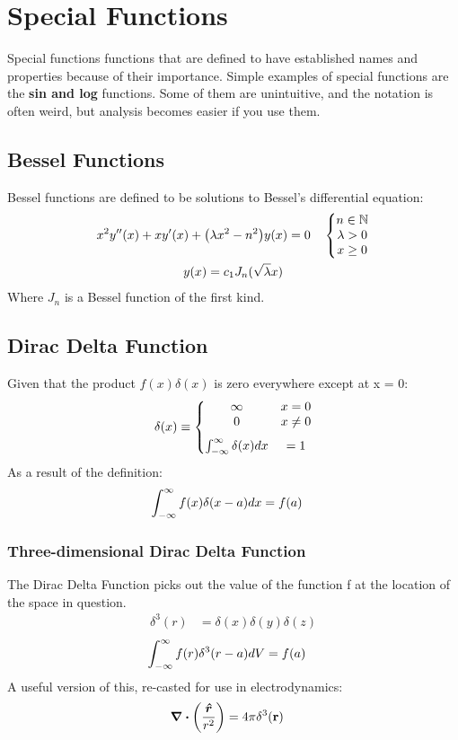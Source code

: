 \section{Special Functions}  
    Special functions functions that are defined to have established names and properties because of their importance. Simple examples of special functions are the {\bf sin and log} functions. Some of them are unintuitive, and the notation is often weird, but analysis becomes easier if you use them. 
    \subsection{Bessel Functions}
        Bessel functions are defined to be solutions to Bessel's differential equation:
        \begin{gather}
            x^2y''(x)+xy'(x)+\qty(\lambda x^2-n^2)y(x)=0\quad\left\{ \begin{gathered} \begin{matrix}  n\in\mathbb{N}\\\lambda>0\\x\geq0 \end{matrix} \end{gathered} \right.
            \\
            y(x)=c_1J_n(\sqrt{\lambda}x)
        \end{gather}
        Where $J_n$ is a Bessel function of the first kind. 
    \subsection{Dirac Delta Function}
        Given that the product $f(x)\delta(x)$ is zero everywhere except at x = 0:
        \begin{align*}
            \delta(x)\equiv\left\{ \begin{gathered} \begin{matrix} 
            \infty & x=0
            \\
            0 & x\neq 0
            \\[0.25 cm]
            \int_{-\infty}^\infty \delta(x) dx &= 1 \end{matrix} \end{gathered} \right.
        \end{align*}
        As a result of the definition:
        \begin{align*}
            \int_{-\infty}^{\infty} f(x) \delta(x-a) dx 
            &= f(a)
        \end{align*}
        \subsubsection*{Three-dimensional Dirac Delta Function}
            The Dirac Delta Function picks out the value of the function f at the location of the space in question.
            \begin{align*}
                {\delta}^3(r) &= \delta(x) \delta(y) \delta(z)
            \end{align*}
            \begin{align*}
                \int_{-\infty}^{\infty} f(r) {\delta}^3(r-a) dV &= f(a)
            \end{align*}
            A useful version of this, re-casted for use in electrodynamics:
            \begin{align*}
                \div\qty(\frac{\e{r}}{{r}^2}) &= 4 \pi {\delta}^3(\vb{r})
            \end{align*}\newpage

